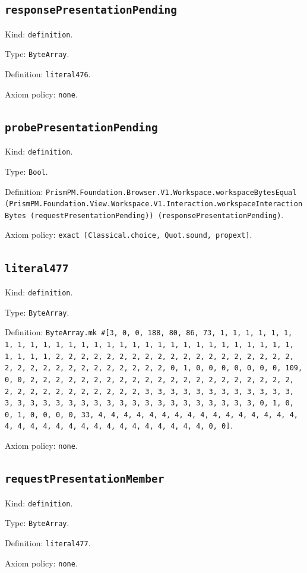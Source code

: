 \documentclass[11pt]{article}
\begin{document}
\subsection*{\texttt{responsePresentationPending}}
\noindent Kind: \texttt{definition}.\par
\noindent Type: \texttt{ByteArray}.\par
\noindent Definition: \texttt{literal476}.\par
\noindent Axiom policy: \texttt{none}.\par
\subsection*{\texttt{probePresentationPending}}
\noindent Kind: \texttt{definition}.\par
\noindent Type: \texttt{Bool}.\par
\noindent Definition: \texttt{PrismPM.Foundation.Browser.V1.Workspace.workspaceBytesEqual (PrismPM.Foundation.View.Workspace.V1.Interaction.workspaceInteractionBytes (requestPresentationPending)) (responsePresentationPending)}.\par
\noindent Axiom policy: \texttt{exact [Classical.choice, Quot.sound, propext]}.\par
\subsection*{\texttt{literal477}}
\noindent Kind: \texttt{definition}.\par
\noindent Type: \texttt{ByteArray}.\par
\noindent Definition: \texttt{ByteArray.mk \#[3, 0, 0, 188, 80, 86, 73, 1, 1, 1, 1, 1, 1, 1, 1, 1, 1, 1, 1, 1, 1, 1, 1, 1, 1, 1, 1, 1, 1, 1, 1, 1, 1, 1, 1, 1, 1, 1, 1, 1, 2, 2, 2, 2, 2, 2, 2, 2, 2, 2, 2, 2, 2, 2, 2, 2, 2, 2, 2, 2, 2, 2, 2, 2, 2, 2, 2, 2, 2, 2, 2, 2, 0, 1, 0, 0, 0, 0, 0, 0, 0, 109, 0, 0, 2, 2, 2, 2, 2, 2, 2, 2, 2, 2, 2, 2, 2, 2, 2, 2, 2, 2, 2, 2, 2, 2, 2, 2, 2, 2, 2, 2, 2, 2, 2, 2, 3, 3, 3, 3, 3, 3, 3, 3, 3, 3, 3, 3, 3, 3, 3, 3, 3, 3, 3, 3, 3, 3, 3, 3, 3, 3, 3, 3, 3, 3, 3, 3, 0, 1, 0, 0, 1, 0, 0, 0, 0, 33, 4, 4, 4, 4, 4, 4, 4, 4, 4, 4, 4, 4, 4, 4, 4, 4, 4, 4, 4, 4, 4, 4, 4, 4, 4, 4, 4, 4, 4, 4, 4, 4, 0, 0]}.\par
\noindent Axiom policy: \texttt{none}.\par
\subsection*{\texttt{requestPresentationMember}}
\noindent Kind: \texttt{definition}.\par
\noindent Type: \texttt{ByteArray}.\par
\noindent Definition: \texttt{literal477}.\par
\noindent Axiom policy: \texttt{none}.\par
\end{document}
